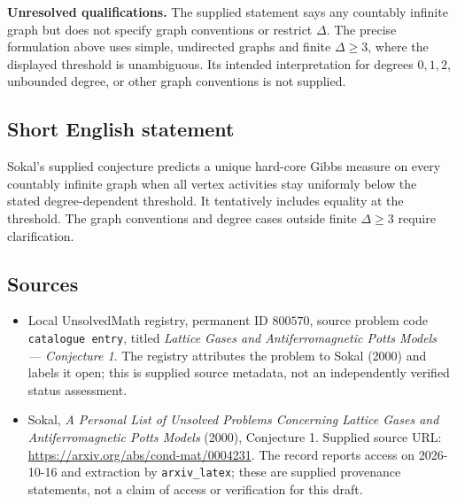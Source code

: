 \documentclass[11pt]{article}
\begin{document}
\textbf{Unresolved qualifications.} The supplied statement says any countably infinite graph but does not specify graph conventions or restrict \(\Delta\). The precise formulation above uses simple, undirected graphs and finite \(\Delta\ge3\), where the displayed threshold is unambiguous. Its intended interpretation for degrees \(0,1,2\), unbounded degree, or other graph conventions is not supplied.
\subsection{Short English statement}
Sokal's supplied conjecture predicts a unique hard-core Gibbs measure on every countably infinite graph when all vertex activities stay uniformly below the stated degree-dependent threshold. It tentatively includes equality at the threshold. The graph conventions and degree cases outside finite \(\Delta\ge3\) require clarification.
\subsection{Sources}
\begin{itemize}
\item Local UnsolvedMath registry, permanent ID \(800570\), source problem code \texttt{catalogue entry}, titled \emph{Lattice Gases and Antiferromagnetic Potts Models --- Conjecture 1}. The registry attributes the problem to Sokal (2000) and labels it open; this is supplied source metadata, not an independently verified status assessment.
\item Sokal, \emph{A Personal List of Unsolved Problems Concerning Lattice Gases and Antiferromagnetic Potts Models} (2000), Conjecture 1. Supplied source URL: \url{https://arxiv.org/abs/cond-mat/0004231}. The record reports access on 2026-10-16 and extraction by \texttt{arxiv\_latex}; these are supplied provenance statements, not a claim of access or verification for this draft.
\end{itemize}
\end{document}
